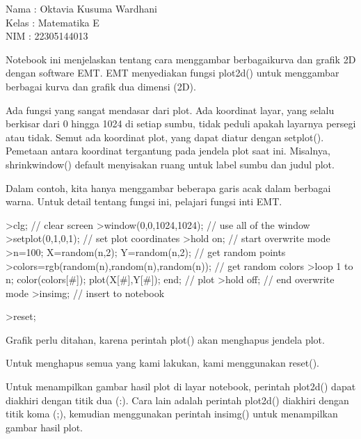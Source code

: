 \documentclass{article}
\begin{document}
\begin{eulernotebook}
\begin{eulercomment}
Nama  : Oktavia Kusuma Wardhani\\
Kelas : Matematika E\\
NIM   : 22305144013

\end{eulercomment}
\eulersubheading{}
\begin{eulercomment}
Notebook ini menjelaskan tentang cara menggambar berbagaikurva dan
grafik 2D dengan software EMT. EMT menyediakan fungsi plot2d() untuk
menggambar berbagai kurva dan grafik dua dimensi (2D).\\
\end{eulercomment}
\begin{eulercomment}
Ada fungsi yang sangat mendasar dari plot. Ada koordinat layar, yang
selalu berkisar dari 0 hingga 1024 di setiap sumbu, tidak peduli
apakah layarnya persegi atau tidak. Semut ada koordinat plot, yang
dapat diatur dengan setplot(). Pemetaan antara koordinat tergantung
pada jendela plot saat ini. Misalnya, shrinkwindow() default
menyisakan ruang untuk label sumbu dan judul plot.

Dalam contoh, kita hanya menggambar beberapa garis acak dalam berbagai
warna. Untuk detail tentang fungsi ini, pelajari fungsi inti EMT.
\end{eulercomment}
\begin{eulerprompt}
>clg; // clear screen
>window(0,0,1024,1024); // use all of the window
>setplot(0,1,0,1); // set plot coordinates
>hold on; // start overwrite mode
>n=100; X=random(n,2); Y=random(n,2);  // get random points
>colors=rgb(random(n),random(n),random(n)); // get random colors
>loop 1 to n; color(colors[#]); plot(X[#],Y[#]); end; // plot
>hold off; // end overwrite mode
>insimg; // insert to notebook
\end{eulerprompt}
\begin{eulerprompt}
>reset;
\end{eulerprompt}
\begin{eulercomment}
Grafik perlu ditahan, karena perintah plot() akan menghapus jendela
plot.

Untuk menghapus semua yang kami lakukan, kami menggunakan reset().

Untuk menampilkan gambar hasil plot di layar notebook, perintah
plot2d() dapat diakhiri dengan titik dua (:). Cara lain adalah
perintah plot2d() diakhiri dengan titik koma (;), kemudian menggunakan
perintah insimg() untuk menampilkan gambar hasil plot.


\end{eulercomment}
\end{eulernotebook}
\end{document}

